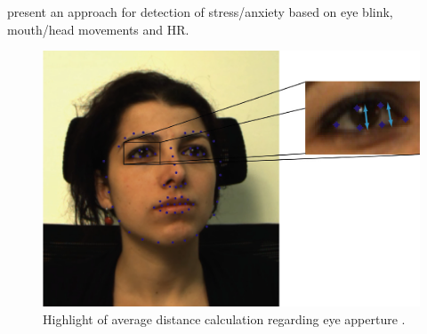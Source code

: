 \textcite{giannakakis2017stress} present an approach for detection of stress/anxiety based on eye blink, mouth/head movements and HR.

\begin{figure}[h]
    \centering
    \includegraphics[width=\linewidth]{figures/giannakakis2017stress-eye.png}
    \caption{Highlight of average distance calculation regarding eye apperture \parencite{giannakakis2017stress}.}
    \label{fig:distance-samara}
\end{figure}
